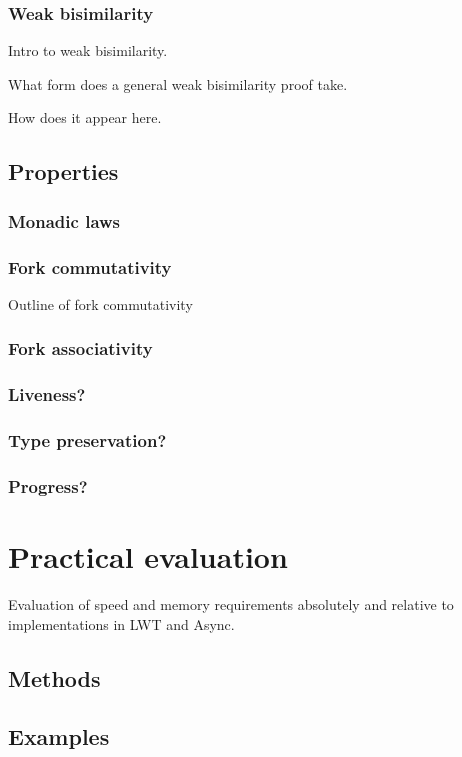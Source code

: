 \documentclass[12pt,twoside,notitlepage]{report}
\begin{document}
\subsubsection{Weak bisimilarity}
Intro to weak bisimilarity.


What form does a general weak bisimilarity proof take.


How does it appear here.
\subsection{Properties}
\subsubsection{Monadic laws}
\subsubsection{Fork commutativity}
Outline of fork commutativity
\subsubsection{Fork associativity}
\subsubsection{Liveness?}
\subsubsection{Type preservation?}
\subsubsection{Progress?} 

\section{Practical evaluation}
Evaluation of speed and memory requirements absolutely and relative to implementations in LWT and Async.
\subsection{Methods}
\subsection{Examples}
\end{document}
